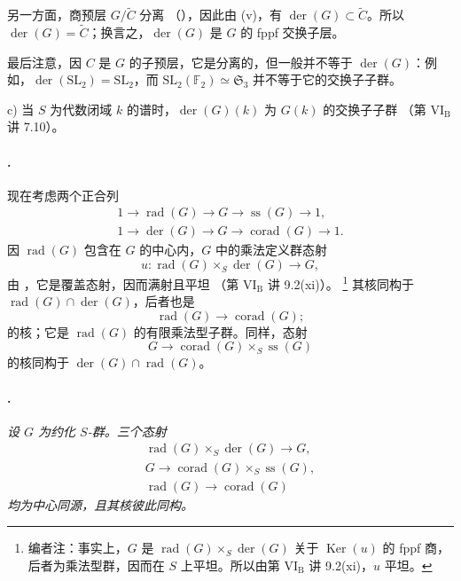 另一方面，商预层 \(G/\widetilde C\) 分离 \textup{（）}，因此由 \textup{(v)}，有 \(\operatorname{der}(G)\subset\widetilde C\)。所以 \(\operatorname{der}(G)=\widetilde C\)；换言之，\(\operatorname{der}(G)\) 是 \(G\) 的 fppf 交换子层。

最后注意，因 \(C\) 是 \(G\) 的子预层，它是分离的，但一般并不等于 \(\operatorname{der}(G)\)：例如，\(\operatorname{der}(\mathrm{SL}_2)=\mathrm{SL}_2\)，而 \(\mathrm{SL}_2(\mathbb F_2)\simeq\mathfrak S_3\) 并不等于它的交换子子群。

\textup{c)} 当 \(S\) 为代数闭域 \(k\) 的谱时，\(\operatorname{der}(G)(k)\) 为 \(G(k)\) 的交换子子群 \textup{（第 \(\mathrm{VI_B}\) 讲 7.10）}。

\paragraph{.}
现在考虑两个正合列
\[
\begin{gathered}
  1\longrightarrow\operatorname{rad}(G)
  \longrightarrow G
  \longrightarrow\operatorname{ss}(G)
  \longrightarrow 1,\\
  1\longrightarrow\operatorname{der}(G)
  \longrightarrow G
  \longrightarrow\operatorname{corad}(G)
  \longrightarrow 1.
\end{gathered}
\]
因 \(\operatorname{rad}(G)\) 包含在 \(G\) 的中心内，\(G\) 中的乘法定义群态射
\[
  u:\operatorname{rad}(G)\times_S\operatorname{der}(G)
  \longrightarrow G,
\]
由 \textup{}，它是覆盖态射，因而满射且平坦 \textup{（第 \(\mathrm{VI_B}\) 讲 9.2\textup{(xi)}）}。
\footnote{编者注：事实上，\(G\) 是 \(\operatorname{rad}(G)\times_S\operatorname{der}(G)\) 关于 \(\operatorname{Ker}(u)\) 的 fppf 商，后者为乘法型群，因而在 \(S\) 上平坦。所以由第 \(\mathrm{VI_B}\) 讲 9.2\textup{(xi)}，\(u\) 平坦。}
其核同构于 \(\operatorname{rad}(G)\cap\operatorname{der}(G)\)，后者也是
\[
  \operatorname{rad}(G)\longrightarrow\operatorname{corad}(G);
\]
的核；它是 \(\operatorname{rad}(G)\) 的有限乘法型子群。同样，态射
\[
  G\longrightarrow
  \operatorname{corad}(G)\times_S\operatorname{ss}(G)
\]
的核同构于 \(\operatorname{der}(G)\cap\operatorname{rad}(G)\)。

\paragraph{.}
\textit{设 \(G\) 为约化 \(S\)-群。三个态射}
\[
\begin{gathered}
  \operatorname{rad}(G)\times_S\operatorname{der}(G)
    \longrightarrow G,\\
  G\longrightarrow
    \operatorname{corad}(G)\times_S\operatorname{ss}(G),\\
  \operatorname{rad}(G)\longrightarrow\operatorname{corad}(G)
\end{gathered}
\]
\textit{均为中心同源，且其核彼此同构。}

